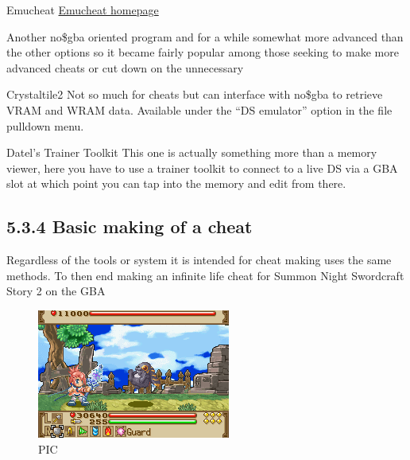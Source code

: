 \documentclass[
]{book}
\begin{document}
Emucheat \href{http://www.emucheat.com/}{Emucheat homepage}

Another no\$gba oriented program and for a while somewhat more advanced than the other options so it became fairly popular among those seeking to make more advanced cheats or cut down on the unnecessary

Crystaltile2 Not so much for cheats but can interface with no\$gba to retrieve VRAM and WRAM data. Available under the ``DS emulator'' option in the file pulldown menu.

Datel's Trainer Toolkit This one is actually something more than a memory viewer, here you have to use a trainer toolkit to connect to a live DS via a GBA slot at which point you can tap into the memory and edit from there.

\hypertarget{basic-making-of-a-cheat}{%
\subsection{5.3.4 Basic making of a cheat}\label{basic-making-of-a-cheat}}

Regardless of the tools or system it is intended for cheat making uses the same methods. To then end making an infinite life cheat for Summon Night Swordcraft Story 2 on the GBA

\begin{figure}
\centering
\includegraphics{images/201_home_fast6191_romhackingguide_unrenamed_fil___ginal_borders_romhackingguidecheatexample_1.png}
\caption{PIC}
\end{figure}
\end{document}

